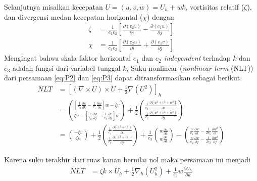 \begin{spacing}{1.5}
	Selanjutnya misalkan kecepatan $U=(u,v,w)=U_h+wk$, vortisitas relatif ($\zeta$), dan divergensi medan kecepatan horizontal ($\chi$) dengan
	\begin{equation}
		\begin{aligned}
			\zeta &= \frac{1}{e_1e_2}\left[\frac{\partial (e_2v)}{\partial i}-\frac{\partial (e_1u)}{\partial j}\right]\\
			\chi &= \frac{1}{e_1e_2}\left[\frac{\partial (e_2u)}{\partial i}+\frac{\partial (e_1v)}{\partial j}\right]
		\end{aligned}
	\end{equation}
	Mengingat bahwa skala faktor horizontal $e_1$ dan $e_2$ \textit{independent} terhadap $k$ dan $e_3$ adalah fungsi dari variabel tunggal $k$, Suku nonlinear (\textit{nonlinear term} (NLT)) dari persamaan \ref{eq:P2} dan \ref{eq:P3} dapat ditransformasikan sebagai berikut.
	\begin{equation*}
		\begin{aligned}
			NLT &= \left[(\nabla \times U)\times U+\frac{1}{2}\nabla(U^2)\right]_h \\
			 &= \binom{\left[\frac{1}{e_3}\frac{\partial u}{\partial k}-\frac{1}{e_1}\frac{\partial w}{\partial i}\right]w-\zeta v}{\zeta v-\left[\frac{1}{e_2}\frac{\partial w}{\partial j}-\frac{1}{e_3}\frac{\partial v}{\partial k}\right]w}+\frac{1}{2}\binom{\frac{1}{e_1}\frac{\partial (u^2+v^2+w^2)}{\partial i}}{\frac{1}{e_2}\frac{\partial (u^2+v^2+w^2)}{\partial j}}\\
			 &=\binom{-\zeta v}{\zeta u}+\frac{1}{2}\binom{\frac{1}{e_1}\frac{\partial (u^2+v^2)}{\partial i}}{\frac{1}{e_2}\frac{\partial (u^2+v^2)}{\partial j}}+\frac{1}{e_3}\binom{w\frac{\partial u}{\partial k}}{w\frac{\partial v}{\partial k}}-\binom{\frac{w}{e_1}\frac{\partial w}{\partial i}-\frac{1}{2e_1}\frac{\partial w^2}{\partial i}}{\frac{w}{e_2}\frac{\partial w}{\partial j}-\frac{1}{2e_2}\frac{\partial w^2}{\partial j}}
		\end{aligned}
	\end{equation*}
	
	Karena suku terakhir dari ruas kanan bernilai nol maka persamaan ini menjadi
	\begin{equation}
		\begin{aligned}
			NLT &= \zeta k \times U_h + \frac{1}{2}\nabla_h (U^2_h) + \frac{1}{e_3}w\frac{\partial U_h}{\partial k}
		\end{aligned}
		\label{eq:flux_1}
	\end{equation}
	

\end{spacing}
